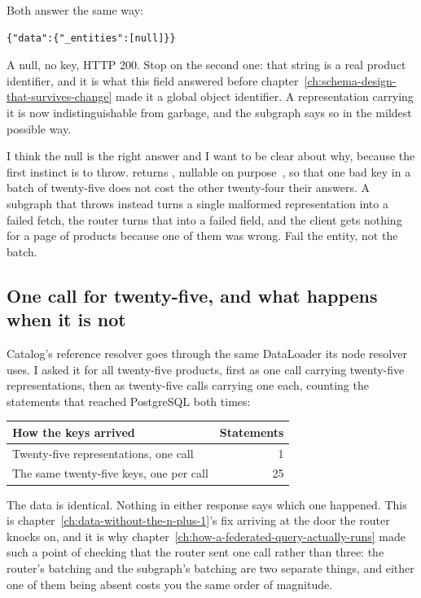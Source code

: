 Both answer the same way:

\begin{verbatim}
{"data":{"_entities":[null]}}
\end{verbatim}

A null, no  key, HTTP 200. Stop on the second one: that string is a
real product identifier, and it is what this field answered before
chapter~\ref{ch:schema-design-that-survives-change} made it a global object
identifier. A representation carrying it is now indistinguishable from garbage,
and the subgraph says so in the mildest possible way.

I think the null is the right answer and I want to be clear about why, because
the first instinct is to throw.  returns \code{[\_Entity]},
nullable on purpose~\autocite{apollo2026subgraphspec}, so that one bad key in a
batch of twenty-five does not cost the other twenty-four their answers. A
subgraph that throws instead turns a single malformed representation into a
failed fetch, the router turns that into a failed field, and the client gets
nothing for a page of products because one of them was wrong. Fail the entity,
not the batch.

\subsection*{One call for twenty-five, and what happens when it is not}

%
Catalog's reference resolver goes through the same DataLoader its node resolver
uses. I asked it for all twenty-five products, first as one 
call carrying twenty-five representations, then as twenty-five calls carrying
one each, counting the statements that reached PostgreSQL both times:

\begin{center}
\begin{tabular}{lr}
\toprule
How the keys arrived & Statements \\
\midrule
Twenty-five representations, one call & 1 \\
The same twenty-five keys, one per call & 25 \\
\bottomrule
\end{tabular}
\end{center}

%
The data is identical. Nothing in either response says which one happened. This
is chapter~\ref{ch:data-without-the-n-plus-1}'s fix arriving at the door the
router knocks on, and it is why
chapter~\ref{ch:how-a-federated-query-actually-runs} made such a point of
checking that the router sent one call rather than three: the router's batching
and the subgraph's batching are two separate things, and either one of them
being absent costs you the same order of magnitude.

